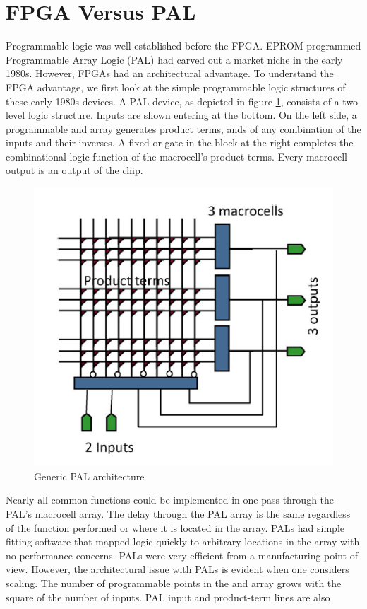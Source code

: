 \section{FPGA Versus PAL}
\noindent Programmable logic was well established before the
FPGA. EPROM-programmed Programmable Array Logic
(PAL) had carved out a market niche in the early 1980s.
However, FPGAs had an architectural advantage. To understand
the FPGA advantage, we first look at the simple
programmable logic structures of these early 1980s devices.
A PAL device, as depicted in figure \ref{fig:pal}, consists of a two level
logic structure. Inputs are shown entering at
the bottom. On the left side, a programmable and array
generates product terms, ands of any combination of the
inputs and their inverses. A fixed or gate in the block at
the right completes the combinational logic function of the
macrocell’s product terms. Every macrocell output is an
output of the chip.
\begin{figure}[H]
	\centering
	\includegraphics[width=0.7\linewidth]{IMG/ch3/PAL}
	\caption{Generic PAL architecture}
	\label{fig:pal}
\end{figure}
\noindent Nearly all common functions could be implemented in one pass through the PAL's macrocell array.
The delay through the PAL array is the same regardless of the function performed or where it is located in the array.
PALs had simple fitting software that mapped logic quickly to arbitrary locations in the array with no performance concerns.
PALs were very efficient from a manufacturing point of view.
However, the architectural issue with PALs is evident when one considers scaling. The number of programmable points in
the and array grows with the square of the number of inputs. PAL input and product-term lines are also
